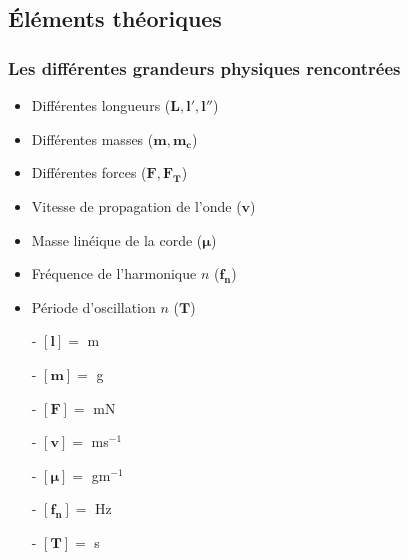 \documentclass[12pt,a4paper]{article}
\begin{document}
    \subsection{Éléments théoriques}
    \subsubsection{Les différentes grandeurs physiques rencontrées}
    \begin{minipage}{0.6\linewidth}
        \begin{itemize}
            \item Différentes longueurs ($\bm{L, l', l''}$)
            \item Différentes masses ($\bm{m, m_c}$)
            \item Différentes forces ($\bm{F, F_T}$)
            \item Vitesse de propagation de l'onde ($\bm{v}$)
            \item Masse linéique de la corde ($\bm{\mu}$)
            \item Fréquence de l'harmonique $n$ ($\bm{f_n}$)
            \item Période d'oscillation $n$ ($\bm{T}$)
        \end{itemize}
    \end{minipage}%
    \hfill
    \begin{minipage}{0.4\linewidth}
        \begin{itemize}
            \item[-] $\bm{[l]} =$ m
            \item[-] $\bm{[m]} =$ g
            \item[-] $\bm{[F]} =$ mN
            \item [-] $\bm{[v]} =$ ms$^{-1}$
            \item[-] $\bm{[\mu]} =$ gm$^{-1}$
            \item[-] $\bm{[f_n]} =$ Hz
            \item[-] $\bm{[T]} =$ s
        \end{itemize}   
    \end{minipage}
\end{document}
